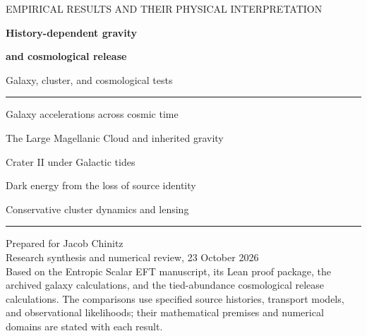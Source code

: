 \documentclass[11pt,a4paper]{article}
\begin{document}
\hypersetup{pageanchor=false}
\begin{titlepage}
\vspace*{17mm}
{\small\sffamily\color{teal}EMPIRICAL RESULTS AND THEIR PHYSICAL INTERPRETATION\par}
\vspace{9mm}
{\Huge\bfseries\color{ink}History-dependent gravity\par}
\vspace{3mm}
{\Huge\bfseries\color{ink}and cosmological release\par}
\vspace{11mm}
{\Large Galaxy, cluster, and cosmological tests\par}
\vspace{14mm}
\rule{\textwidth}{.5pt}
\vspace{4mm}
{\large Galaxy accelerations across cosmic time\par}
{\large The Large Magellanic Cloud and inherited gravity\par}
{\large Crater II under Galactic tides\par}
{\large Dark energy from the loss of source identity\par}
{\large Conservative cluster dynamics and lensing\par}
\vspace{4mm}
\rule{\textwidth}{.5pt}
\vfill
Prepared for Jacob Chinitz\\
Research synthesis and numerical review, 23 October 2026\\[5mm]
\small Based on the Entropic Scalar EFT manuscript, its Lean proof package,
the archived galaxy calculations, and the tied-abundance cosmological
release calculations. The comparisons use specified source histories,
transport models, and observational likelihoods; their mathematical
premises and numerical domains are stated with each result.
\end{titlepage}
\hypersetup{pageanchor=true}
\tableofcontents
\clearpage
{}

\clearpage

\clearpage

\clearpage

\clearpage

\clearpage

\clearpage

\clearpage

\clearpage

\end{document}
